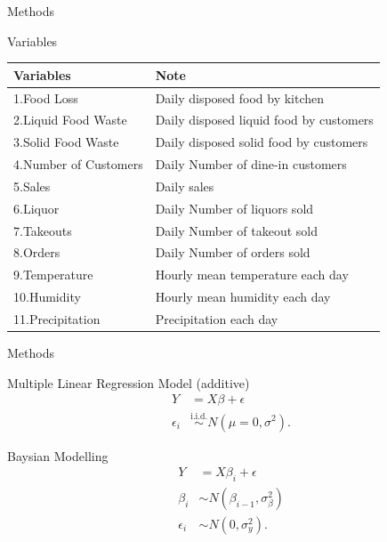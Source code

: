 \documentclass[
  ignorenonframetext,
]{beamer}
\begin{document}
\begin{frame}{Methods}
\protect\hypertarget{methods-4}{}
\begin{block}{Variables}
\protect\hypertarget{variables}{}
\begin{longtable}[]{@{}ll@{}}
\toprule()
Variables & Note \\
\midrule()
\endhead
1.Food Loss & Daily disposed food by kitchen \\
2.Liquid Food Waste & Daily disposed liquid food by customers \\
3.Solid Food Waste & Daily disposed solid food by customers \\
4.Number of Customers & Daily Number of dine-in customers \\
5.Sales & Daily sales \\
6.Liquor & Daily Number of liquors sold \\
7.Takeouts & Daily Number of takeout sold \\
8.Orders & Daily Number of orders sold \\
9.Temperature & Hourly mean temperature each day \\
10.Humidity & Hourly mean humidity each day \\
11.Precipitation & Precipitation each day \\
\bottomrule()
\end{longtable}
\end{block}
\end{frame}

\begin{frame}{Methods}
\protect\hypertarget{methods-5}{}
\begin{block}{Multiple Linear Regression Model (additive)}
\protect\hypertarget{multiple-linear-regression-model-additive}{}
\[
\begin{aligned}
Y &=  X\beta + \epsilon\\
\epsilon_i &\overset{\text{i.i.d.}}{\sim} N(\mu=0, \sigma^2).
\end{aligned}
\]
\end{block}

\begin{block}{Baysian Modelling}
\protect\hypertarget{baysian-modelling}{}
\[
\begin{aligned}
Y &= X\beta_i + \epsilon\\
\beta_{i} &\sim N(\beta_{i-1}, \sigma_{\beta}^2)\\
\epsilon_i &\sim N(0, \sigma_{y}^2).
\end{aligned}
\]
\end{block}
\end{frame}
\end{document}
